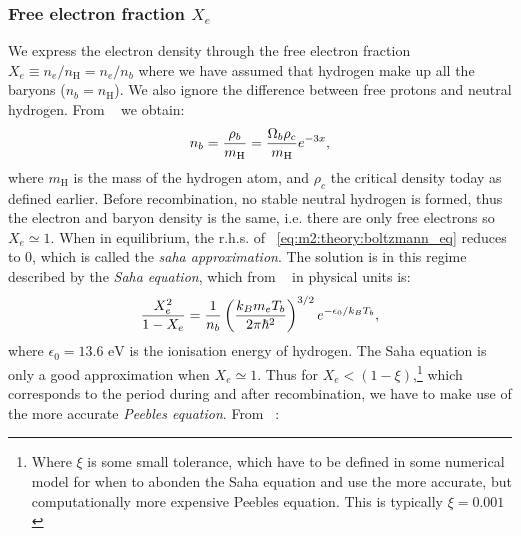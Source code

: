 \subsubsection{Free electron fraction $X_e$}\label{sec:m2:theory:free_electron_fraction}
    We express the electron density through the free electron fraction $X_e \equiv n_e/n_\mathrm{H} = n_e/n_b$ where we have assumed that hydrogen make up all the baryons ($n_b=n_\mathrm{H}$). We also ignore the difference between free protons and neutral hydrogen. From ~\cite{https://doi.org/10.48550/arxiv.astro-ph/0606683} we obtain:
    \begin{equation}\label{eq:m2:theory:baryon_number_density}
        n_b = \frac{\rho_b}{m_\mathrm{H}} = \frac{\Omega_b\rho_c}{m_\mathrm{H}}e^{-3x},
    \end{equation}
    where $m_\mathrm{H}$ is the mass of the hydrogen atom, and $\rho_c$ the critical density today as defined earlier. Before recombination, no stable neutral hydrogen is formed, thus the electron and baryon density is the same, i.e. there are only free electrons so $X_e \simeq 1$. When in equilibrium, the r.h.s. of ~\cref{eq:m2:theory:boltzmann_eq} reduces to 0, which is called the \textit{saha approximation}. The solution is in this regime described by the \textit{Saha equation}, which from ~\cite{dodelson2020modern} in physical units is:
    \begin{equation}\label{eq:m2:theory:Saha_equation}
        \frac{X_e^2}{1-X_e} = \frac{1}{n_b}\left(\frac{k_Bm_eT_b}{2\pi\hbar^2}\right)^{3/2}e^{-\epsilon_0/k_BT_b},
    \end{equation}
    where $\epsilon_0 = 13.6\text{ eV}$ is the ionisation energy of hydrogen. The Saha equation is only a good approximation when $X_e \simeq 1$. Thus for $X_e < (1-\xi)$,\footnote{Where $\xi$ is some small tolerance, which have to be defined in some numerical model for when to abonden the Saha equation and use the more accurate, but computationally more expensive Peebles equation. This is typically $\xi=0.001$} which corresponds to the period during and after recombination, we have to make use of the more accurate \textit{Peebles equation}. From ~\cite{https://doi.org/10.48550/arxiv.astro-ph/0606683}:
